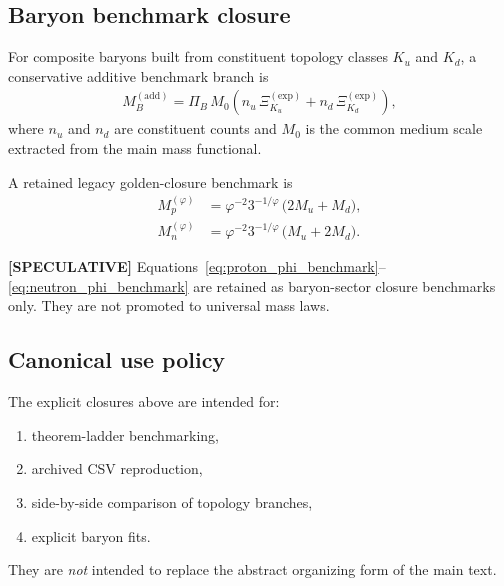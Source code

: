 \documentclass[11pt]{article}
\theoremstyle{definition}
\theoremstyle{plain}
\theoremstyle{remark}
\begin{document}
    \subsection{Baryon benchmark closure}
        For composite baryons built from constituent topology classes \(K_u\) and \(K_d\), a conservative additive benchmark branch is
        \begin{align}
            M_B^{(\mathrm{add})}
            =
            \Pi_B\,M_0
            \left(
                n_u\,\Xi_{K_u}^{(\mathrm{exp})}
                +
                n_d\,\Xi_{K_d}^{(\mathrm{exp})}
            \right),
            \label{eq:baryon_additive_branch}
        \end{align}
        where \(n_u\) and \(n_d\) are constituent counts and \(M_0\) is the common medium scale extracted from the main mass functional.
        
        A retained legacy golden-closure benchmark is
        \begin{align}
            M_p^{(\varphi)}
            &=
            \varphi^{-2} 3^{-1/\varphi}\,\bigl(2M_u + M_d\bigr),
            \label{eq:proton_phi_benchmark}\\
            M_n^{(\varphi)}
            &=
            \varphi^{-2} 3^{-1/\varphi}\,\bigl(M_u + 2M_d\bigr).
            \label{eq:neutron_phi_benchmark}
        \end{align}
        
        \textbf{[SPECULATIVE]} Equations~\eqref{eq:proton_phi_benchmark}--\eqref{eq:neutron_phi_benchmark} are retained as baryon-sector closure benchmarks only. They are not promoted to universal mass laws.
    
    \subsection{Canonical use policy}
        The explicit closures above are intended for:
        \begin{enumerate}
            \item theorem-ladder benchmarking,
            \item archived CSV reproduction,
            \item side-by-side comparison of topology branches,
            \item explicit baryon fits.
        \end{enumerate}
        They are \emph{not} intended to replace the abstract organizing form of the main text.
    
\end{document}
